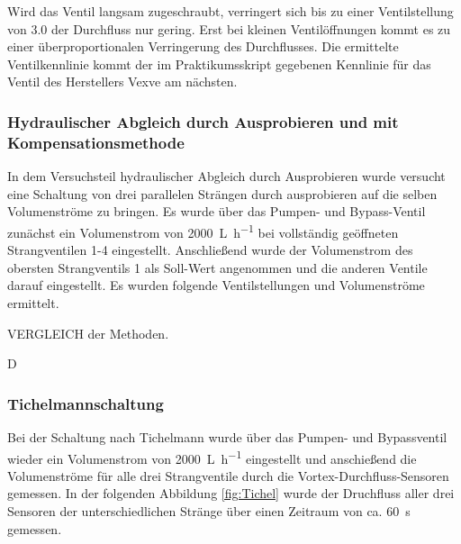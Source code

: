 Wird das Ventil langsam zugeschraubt, verringert sich bis zu einer Ventilstellung von \num{3,0} der Durchfluss nur gering. Erst bei kleinen Ventilöffnungen kommt es zu einer überproportionalen Verringerung des Durchflusses. Die ermittelte Ventilkennlinie kommt der im Praktikumsskript gegebenen Kennlinie für das Ventil des Herstellers Vexve am nächsten. 

\subsubsection{Hydraulischer Abgleich durch Ausprobieren und mit Kompensationsmethode }

In dem Versuchsteil hydraulischer Abgleich durch Ausprobieren wurde versucht eine Schaltung von drei parallelen Strängen durch ausprobieren auf die selben Volumenströme zu bringen. Es wurde über das Pumpen- und Bypass-Ventil zunächst ein Volumenstrom von \SI{2000}{\liter\per\hour} bei vollständig geöffneten Strangventilen 1-4 eingestellt. Anschließend wurde der Volumenstrom des obersten Strangventils 1 als Soll-Wert angenommen und die anderen Ventile darauf eingestellt. Es wurden folgende Ventilstellungen und Volumenströme ermittelt. 

VERGLEICH der Methoden. 


D



\subsubsection{Tichelmannschaltung}

Bei der Schaltung nach Tichelmann wurde über das Pumpen- und Bypassventil wieder ein Volumenstrom von \SI{2000}{\liter\per\hour} eingestellt und anschießend die Volumenströme für alle drei Strangventile durch die Vortex-Durchfluss-Sensoren gemessen. In der folgenden Abbildung \ref{fig:Tichel} wurde der Druchfluss aller drei Sensoren der unterschiedlichen Stränge über einen Zeitraum von ca. \SI{60}{\second} gemessen.

